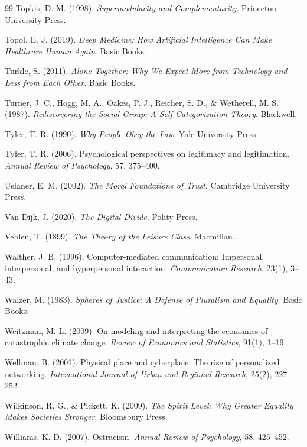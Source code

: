 \begin{thebibliography}{99}
Topkis, D. M. (1998).
\textit{Supermodularity and Complementarity}.
Princeton University Press.

Topol, E. J. (2019).
\textit{Deep Medicine: How Artificial Intelligence Can Make Healthcare Human Again}.
Basic Books.

Turkle, S. (2011).
\textit{Alone Together: Why We Expect More from Technology and Less from Each Other}.
Basic Books.

Turner, J. C., Hogg, M. A., Oakes, P. J., Reicher, S. D., \& Wetherell, M. S. (1987).
\textit{Rediscovering the Social Group: A Self-Categorization Theory}.
Blackwell.

Tyler, T. R. (1990).
\textit{Why People Obey the Law}.
Yale University Press.

Tyler, T. R. (2006).
Psychological perspectives on legitimacy and legitimation.
\textit{Annual Review of Psychology}, 57, 375--400.

Uslaner, E. M. (2002).
\textit{The Moral Foundations of Trust}.
Cambridge University Press.

Van Dijk, J. (2020).
\textit{The Digital Divide}.
Polity Press.

Veblen, T. (1899).
\textit{The Theory of the Leisure Class}.
Macmillan.

Walther, J. B. (1996).
Computer-mediated communication: Impersonal, interpersonal, and hyperpersonal interaction.
\textit{Communication Research}, 23(1), 3--43.

Walzer, M. (1983).
\textit{Spheres of Justice: A Defense of Pluralism and Equality}.
Basic Books.

Weitzman, M. L. (2009).
On modeling and interpreting the economics of catastrophic climate change.
\textit{Review of Economics and Statistics}, 91(1), 1--19.

Wellman, B. (2001).
Physical place and cyberplace: The rise of personalized networking.
\textit{International Journal of Urban and Regional Research}, 25(2), 227--252.

Wilkinson, R. G., \& Pickett, K. (2009).
\textit{The Spirit Level: Why Greater Equality Makes Societies Stronger}.
Bloomsbury Press.

Williams, K. D. (2007).
Ostracism.
\textit{Annual Review of Psychology}, 58, 425--452.


\end{thebibliography}
